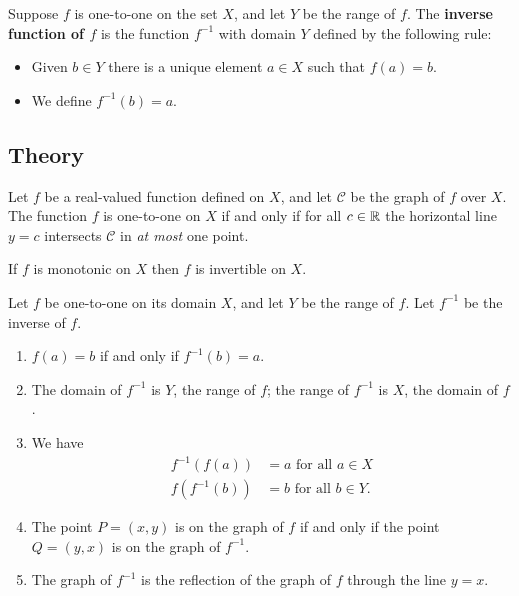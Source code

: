 \begin{namedtheorem} Suppose $f$ is one-to-one on the set $X$, and let $Y$ be the range of $f$. The {\bf inverse function of $f$} is the function $f^{-1}$ with domain $Y$ defined by the following rule:
  \begin{itemize}
    \item Given $b\in Y$ there is a unique element $a\in X$ such that $f(a)=b$.
    \item We define $f^{-1}(b)=a$.
  \end{itemize}

\end{namedtheorem}

 \subsection*{Theory}
\begin{namedtheorem} Let $f$ be a real-valued function defined on $X$, and let $\mathcal{C}$ be the graph of $f$ over $X$. The function $f$ is one-to-one on $X$ if and only if for all $c\in{\mathbb R}$ the horizontal line $y=c$ intersects $\mathcal{C}$ in {\em at most} one point.

\end{namedtheorem}
\begin{namedtheorem} If $f$ is monotonic on $X$ then $f$ is invertible on $X$.
\end{namedtheorem}
\begin{namedtheorem} Let $f$ be one-to-one on its domain $X$, and let $Y$ be the range of $f$. Let $f^{-1}$ be the inverse of $f$.
  \begin{enumerate}[itemsep=0pt]
    \item $f(a)=b$ if and only if $f^{-1}(b)=a$.
    \item The domain of $f^{-1}$ is $Y$, the range of $f$; the range of $f^{-1}$ is $X$, the domain of $f$.
    \item We have
    \begin{align*}
      f^{-1}(f(a))&=a \text{ for all } a\in X\\
      f(f^{-1}(b))&=b \text{ for all } b\in Y.
    \end{align*}
    \item The point $P=(x,y)$ is on the graph of $f$ if and only if the point $Q=(y,x)$ is on the graph of $f^{-1}$.
    \item The graph of $f^{-1}$ is the reflection of the graph of $f$ through the line $y=x$.
  \end{enumerate}

\end{namedtheorem}
